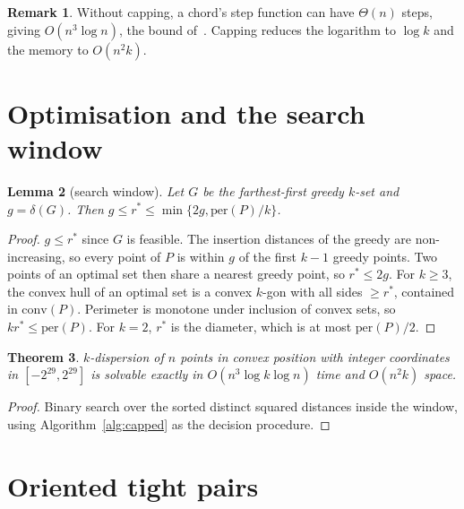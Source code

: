 \documentclass[11pt,a4paper]{article}
\newtheorem{theorem}{Theorem}
\newtheorem{lemma}[theorem]{Lemma}
\theoremstyle{definition}
\newtheorem{remark}[theorem]{Remark}
\newcommand{\opt}{r^{*}}
\begin{document}
\begin{remark}
Without capping, a chord's step function can have $\Theta(n)$ steps, giving
$O(n^3\log n)$, the bound of~\cite{TW26}. Capping reduces the logarithm to
$\log k$ and the memory to $O(n^2k)$.
\end{remark}

\section{Optimisation and the search window}

\begin{lemma}[search window]\label{lem:window}
Let $G$ be the farthest-first greedy $k$-set and $g=\delta(G)$. Then
$g\le\opt\le\min\{2g,\mathrm{per}(P)/k\}$.
\end{lemma}
\begin{proof}
$g\le\opt$ since $G$ is feasible. The insertion distances of the greedy are
non-increasing, so every point of $P$ is within $g$ of the first $k-1$ greedy
points. Two points of an optimal set then share a nearest greedy point, so
$\opt\le2g$. For $k\ge3$, the convex hull of an optimal set is a convex
$k$-gon with all sides $\ge\opt$, contained in $\mathrm{conv}(P)$. Perimeter is
monotone under inclusion of convex sets, so $k\opt\le\mathrm{per}(P)$. For
$k=2$, $\opt$ is the diameter, which is at most $\mathrm{per}(P)/2$.
\end{proof}

\begin{theorem}\label{thm:main}
$k$-dispersion of $n$ points in convex position with integer coordinates in
$[-2^{29},2^{29}]$ is solvable exactly in $O(n^3\log k\log n)$ time and
$O(n^2k)$ space.
\end{theorem}
\begin{proof}
Binary search over the sorted distinct squared distances inside the window,
using Algorithm~\ref{alg:capped} as the decision procedure.
\end{proof}

\section{Oriented tight pairs}\label{sec:tight}
\end{document}
